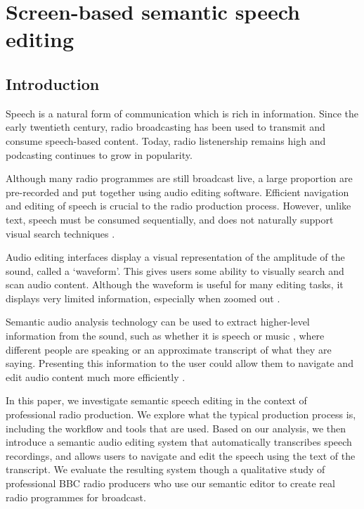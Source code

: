 \chapter{Screen-based semantic speech editing}

\section{Introduction}
Speech is a natural form of communication which is rich in information. Since
the early twentieth century, radio broadcasting has been used to transmit and
consume speech-based content. Today, radio listenership remains high and
podcasting continues to grow in popularity. 

Although many radio programmes are still broadcast live, a large proportion are
pre-recorded and put together using audio editing software. Efficient
navigation and editing of speech is crucial to the radio production process.
However, unlike text, speech must be consumed sequentially, and does not
naturally support visual search techniques \citep{Wolfe2004}. 

Audio editing interfaces display a visual representation of the amplitude of
the sound, called a `waveform'. This gives users some ability to visually
search and scan audio content. Although the waveform is useful for many editing
tasks, it displays very limited information, especially when zoomed out
\citep{Loviscach2011}.

Semantic audio analysis technology can be used to extract higher-level
information from the sound, such as whether it is speech or music
\citep{Panagiotakis2005}, where different people are speaking
\citep{AngueraMiro2012} or an approximate transcript of what they are saying.
Presenting this information to the user could allow them to navigate and edit
audio content much more efficiently \citep{Whittaker2004}.

In this paper, we investigate semantic speech editing in the context of
professional radio production. We explore what the typical production process
is, including the workflow and tools that are used. Based on our
analysis, we then introduce a semantic audio editing system that automatically
transcribes speech recordings, and allows users to navigate and edit the speech
using the text of the transcript.  We evaluate the resulting system though a
qualitative study of professional BBC radio producers who use our semantic
editor to create real radio programmes for broadcast.


